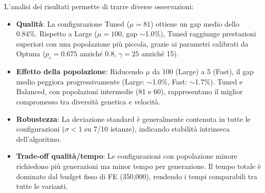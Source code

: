 L'analisi dei risultati permette di trarre diverse osservazioni:
\begin{itemize}[nosep]
    \item \textbf{Qualit\`a}: La configurazione Tuned ($\mu=81$) ottiene un gap medio
    dello 0.84\%. Rispetto a Large ($\mu=100$, gap $\sim$1.0\%), Tuned
    raggiunge prestazioni superiori con una popolazione pi\`u piccola, grazie ai
    parametri calibrati da Optuna ($p_c=0.675$ anzich\'e 0.8, $\gamma=25$
    anzich\'e 15).
    \item \textbf{Effetto della popolazione}: Riducendo $\mu$ da 100 (Large) a 5
    (Fast), il gap medio peggiora progressivamente (Large: $\sim$1.0\%, Fast:
    $\sim$1.7\%). Tuned e Balanced, con popolazioni intermedie (81 e 60),
    rappresentano il miglior compromesso tra diversit\`a genetica e velocit\`a.
    \item \textbf{Robustezza}: La deviazione standard \`e generalmente contenuta
    in tutte le configurazioni ($\sigma < 1$ su 7/10 istanze), indicando
    stabilit\`a intrinseca dell'algoritmo.
    \item \textbf{Trade-off qualit\`a/tempo}: Le configurazioni con popolazione
    minore richiedono pi\`u generazioni ma minor tempo per generazione. Il tempo
    totale \`e dominato dal budget fisso di FE (350{,}000), rendendo i tempi
    comparabili tra tutte le varianti.
\end{itemize}
